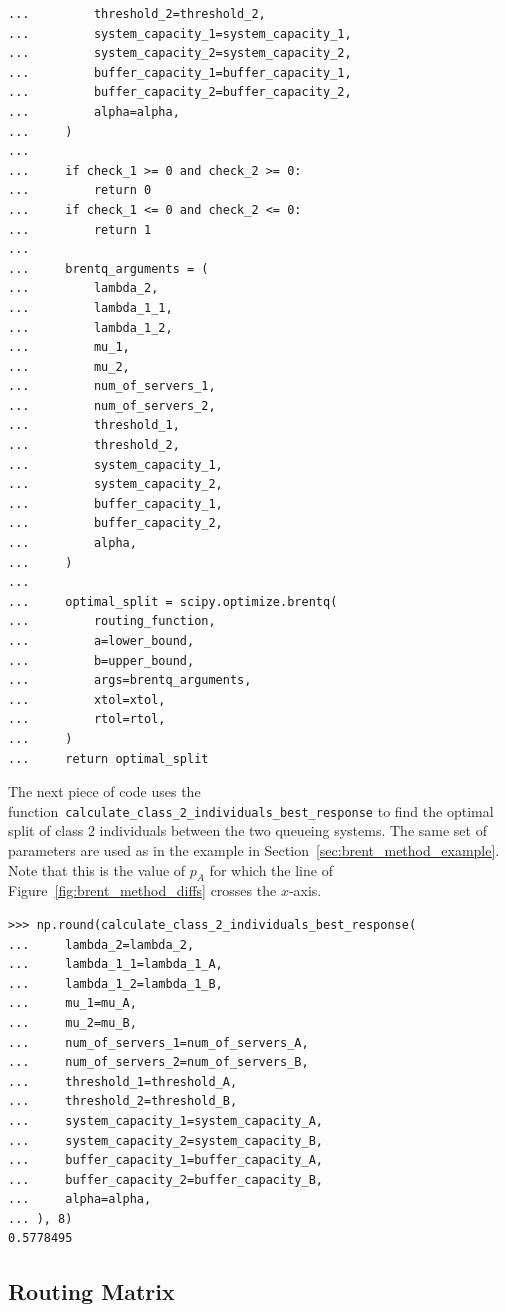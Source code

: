 \begin{lstlisting}[style=pystyle]
...         threshold_2=threshold_2,
...         system_capacity_1=system_capacity_1,
...         system_capacity_2=system_capacity_2,
...         buffer_capacity_1=buffer_capacity_1,
...         buffer_capacity_2=buffer_capacity_2,
...         alpha=alpha,
...     )
...
...     if check_1 >= 0 and check_2 >= 0:
...         return 0
...     if check_1 <= 0 and check_2 <= 0:
...         return 1
...
...     brentq_arguments = (
...         lambda_2,
...         lambda_1_1,
...         lambda_1_2,
...         mu_1,
...         mu_2,
...         num_of_servers_1,
...         num_of_servers_2,
...         threshold_1,
...         threshold_2,
...         system_capacity_1,
...         system_capacity_2,
...         buffer_capacity_1,
...         buffer_capacity_2,
...         alpha,
...     )
...
...     optimal_split = scipy.optimize.brentq(
...         routing_function,
...         a=lower_bound,
...         b=upper_bound,
...         args=brentq_arguments,
...         xtol=xtol,
...         rtol=rtol,
...     )
...     return optimal_split

\end{lstlisting}

The next piece of code uses the
function~\lstinline[style=pystyle]{calculate_class_2_individuals_best_response}
to find the optimal split of class 2 individuals between the two queueing
systems.
The same set of parameters are used as in the example in
Section~\ref{sec:brent_method_example}.
Note that this is the value of \(p_A\) for which the line of
Figure~\ref{fig:brent_method_diffs} crosses the \(x\)-axis.

\begin{lstlisting}[style=pystyle]
>>> np.round(calculate_class_2_individuals_best_response(
...     lambda_2=lambda_2,
...     lambda_1_1=lambda_1_A,
...     lambda_1_2=lambda_1_B,
...     mu_1=mu_A,
...     mu_2=mu_B,
...     num_of_servers_1=num_of_servers_A,
...     num_of_servers_2=num_of_servers_B,
...     threshold_1=threshold_A,
...     threshold_2=threshold_B,
...     system_capacity_1=system_capacity_A,
...     system_capacity_2=system_capacity_B,
...     buffer_capacity_1=buffer_capacity_A,
...     buffer_capacity_2=buffer_capacity_B,
...     alpha=alpha,
... ), 8)
0.5778495

\end{lstlisting}


\subsection{Routing Matrix}\label{sec:routing_matrix}

